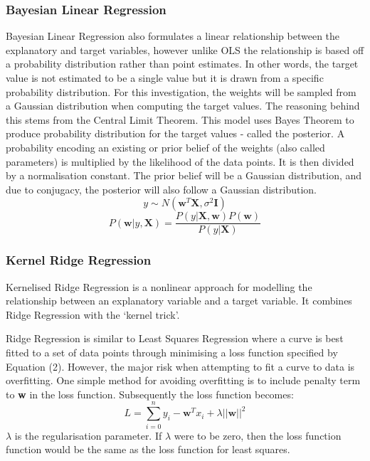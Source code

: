 \documentclass[a4paper,11pt,twoside]{article}
\begin{document}
\subsubsection{Bayesian Linear Regression}
Bayesian Linear Regression also formulates a linear relationship between the explanatory and target variables, however unlike OLS the relationship is based off a probability distribution rather than point estimates. In other words, the target value is not estimated to be a single value but it is drawn from a specific probability distribution. For this investigation, the weights will be sampled from a Gaussian distribution when computing the target values. The reasoning behind this stems from the Central Limit Theorem. This model uses Bayes Theorem to produce probability distribution for the target values - called the posterior. A probability encoding an existing or prior belief of the weights (also called parameters) is multiplied by the likelihood of the data points. It is then divided by a normalisation constant. The prior belief will be a Gaussian distribution, and due to conjugacy, the posterior will also follow a Gaussian distribution. 
\begin{equation}
 y \sim N(\textbf{w}^T\textbf{X}, \sigma^2\textbf{I})
\end{equation}
\begin{equation}
P(\textbf{w}|y,\textbf{X}) = \frac{P(y|\textbf{X},\textbf{w})P(\textbf{w})}{P(y|\textbf{X})}
\end{equation}

\subsubsection{Kernel Ridge Regression}

Kernelised Ridge Regression is a nonlinear approach for modelling the relationship between an explanatory variable and a target variable. It combines Ridge Regression with the `kernel trick'.

Ridge Regression is similar to Least Squares Regression where a curve is best fitted to a set of data points through minimising a loss function specified by Equation (2). However, the major risk when attempting to fit a curve to data is overfitting. One simple method for avoiding overfitting is to include penalty term to \textbf{w} in the loss function. Subsequently the loss function becomes: 
\begin{equation}
L = \sum_{i=0}^{n}y_{i} - \textbf{w}^Tx_{i} + \lambda||\textbf{w}||^2
\end{equation}
$\lambda$ is the regularisation parameter. If $\lambda$ were to be zero, then the loss function function would be the same as the loss function for least squares.
\end{document}
